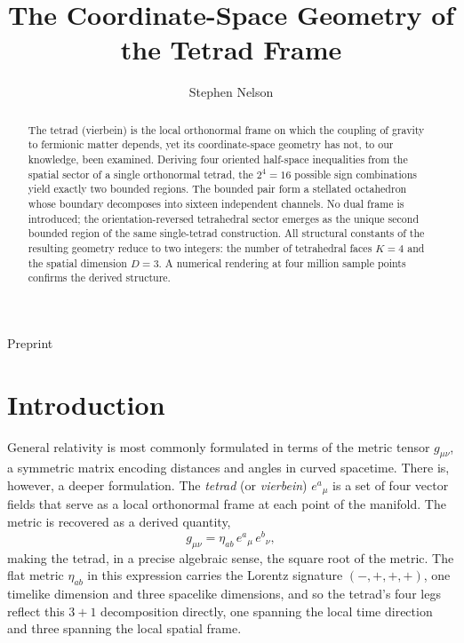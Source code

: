 \documentclass[twocolumn]{iopjournal}
\renewcommand{\articletype}[1]{%
  {\vspace*{-8mm}\noindent \Large \sf Preprint}\par
  \vspace*{6mm}\noindent{\scriptsize \sf{\bfseries \MakeUppercase{#1}}}}
\begin{document}
\articletype{Letter}

\title{The Coordinate-Space Geometry of the Tetrad Frame}

\author{Stephen Nelson}


\begin{abstract}
The tetrad (vierbein) is the local orthonormal frame on which the coupling of gravity to fermionic matter depends, yet its coordinate-space geometry has not, to our knowledge, been examined. Deriving four oriented half-space inequalities from the spatial sector of a single orthonormal tetrad, the $2^4 = 16$ possible sign combinations yield exactly two bounded regions. The bounded pair form a stellated octahedron whose boundary decomposes into sixteen independent channels. No dual frame is introduced; the orientation-reversed tetrahedral sector emerges as the unique second bounded region of the same single-tetrad construction. All structural constants of the resulting geometry reduce to two integers: the number of tetrahedral faces $K = 4$ and the spatial dimension $D = 3$. A numerical rendering at four million sample points confirms the derived structure.
\end{abstract}


\section*{Introduction}

General relativity is most commonly formulated in terms of the metric tensor $g_{\mu\nu}$, a symmetric matrix encoding distances and angles in curved spacetime. There is, however, a deeper formulation. The \emph{tetrad} (or \emph{vierbein}) $e^a{}_\mu$ is a set of four vector fields that serve as a local orthonormal frame at each point of the manifold. The metric is recovered as a derived quantity,
\begin{equation}
g_{\mu\nu} = \eta_{ab}\, e^a{}_\mu\, e^b{}_\nu,
\end{equation}
making the tetrad, in a precise algebraic sense, the square root of the metric. The flat metric $\eta_{ab}$ in this expression carries the Lorentz signature $(-,+,+,+)$, one timelike dimension and three spacelike dimensions, and so the tetrad's four legs reflect this $3+1$ decomposition directly, one spanning the local time direction and three spanning the local spatial frame.
\end{document}
